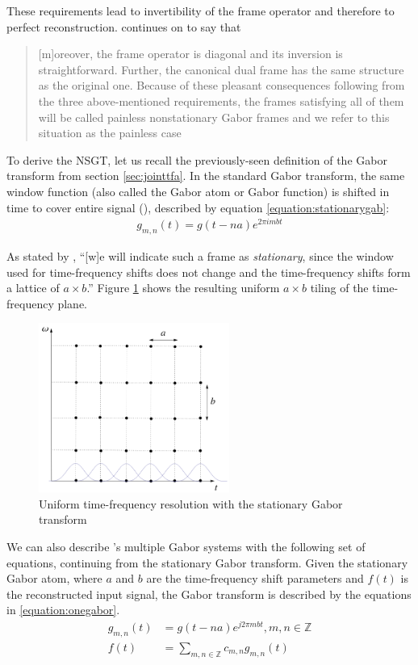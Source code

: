 \documentclass[report.tex]{subfiles}
\begin{document}
These requirements lead to invertibility of the frame operator and therefore to perfect reconstruction. \textcite{balazs} continues on to say that

\begin{quote}
	[m]oreover, the frame operator is diagonal and its inversion is straightforward. Further, the canonical dual frame has the same structure as the original one. Because of these pleasant consequences following from the three above-mentioned requirements, the frames satisfying all of them will be called painless nonstationary Gabor frames and we refer to this situation as the painless case
\end{quote}

To derive the NSGT, let us recall the previously-seen definition of the Gabor transform from section \ref{sec:jointtfa}. In the standard Gabor transform, the same window function (also called the Gabor atom or Gabor function) is shifted in time to cover entire signal (\cite{adaptivecqt}), described by equation \ref{equation:stationarygab}:
\begin{align} \tag{10}\label{equation:stationarygab}
g_{m, n}(t) = g(t - na)e^{2\pi i m b t}
\end{align}

As stated by \textcite{adaptivecqt}, ``[w]e will indicate such a frame as \textit{stationary}, since the window used for time-frequency shifts does not change and the time-frequency shifts form a lattice of $a \times b$.'' Figure \ref{fig:uniformtflattice} shows the resulting uniform $a \times b$ tiling of the time-frequency plane.

\begin{figure}[ht]
	\centering
	\includegraphics[width=6.25cm]{./images-tftheory/stationarygabor.png}
	\caption{Uniform time-frequency resolution with the stationary Gabor transform}
	\label{fig:uniformtflattice}
\end{figure}

We can also describe \textcite{doerflerphd}'s multiple Gabor systems with the following set of equations, continuing from the stationary Gabor transform. Given the stationary Gabor atom, where $a$ and $b$ are the time-frequency shift parameters and $f(t)$ is the reconstructed input signal, the Gabor transform is described by the equations in \ref{equation:onegabor}.
\begin{align}
	\nonumber g_{m,n}(t) &= g(t - na)e^{j2\pi m b t}, m,n \in \mathbb{Z}\\
	\nonumber f(t) &= \sum_{m,n \in \mathbb{Z}}c_{m,n}g_{m,n}(t) \tag{12}\label{equation:onegabor}
\end{align}
\end{document}
